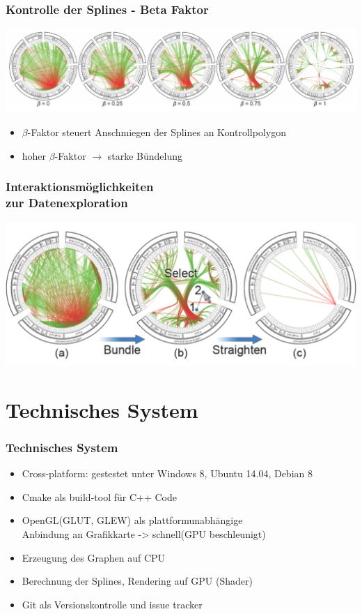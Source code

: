 \documentclass[11pt]{beamer}
\begin{document}
\begin{frame}
\frametitle{Kontrolle der Splines - Beta Faktor}
\includegraphics[scale=0.35]{./Algorithm_BetaFactor_Results.png}
\begin{itemize}
\bigskip
\item $\beta$-Faktor steuert Anschmiegen der Splines an Kontrollpolygon
\item hoher $\beta$-Faktor $\rightarrow$ starke Bündelung
\end{itemize}

\end{frame}

\begin{frame}
\frametitle{Interaktionsmöglichkeiten\\ zur Datenexploration}
\includegraphics[scale=0.30]{./Algorithm_Interaction.png}
\end{frame}

\section{Technisches System}
\begin{frame}
\frametitle{Technisches System}

\begin{itemize}
\item Cross-platform: gestestet unter Windows 8, Ubuntu 14.04, Debian 8
\item Cmake als build-tool für C++ Code
\item OpenGL(GLUT, GLEW) als plattformunabhängige  
\\ Anbindung an Grafikkarte -> schnell(GPU beschleunigt) 
\item Erzeugung des Graphen auf CPU
\item Berechnung der Splines, Rendering auf GPU (Shader)
\item Git als Versionskontrolle und issue tracker
\end{itemize}

\end{frame}
\end{document}
